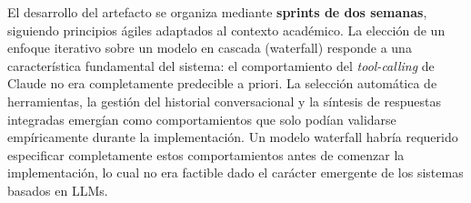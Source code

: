 El desarrollo del artefacto se organiza mediante \textbf{sprints de dos semanas}, siguiendo principios ágiles adaptados al contexto académico. La elección de un enfoque iterativo sobre un modelo en cascada (waterfall) responde a una característica fundamental del sistema: el comportamiento del \textit{tool-calling} de Claude no era completamente predecible a priori. La selección automática de herramientas, la gestión del historial conversacional y la síntesis de respuestas integradas emergían como comportamientos que solo podían validarse empíricamente durante la implementación. Un modelo waterfall habría requerido especificar completamente estos comportamientos antes de comenzar la implementación, lo cual no era factible dado el carácter emergente de los sistemas basados en LLMs.

